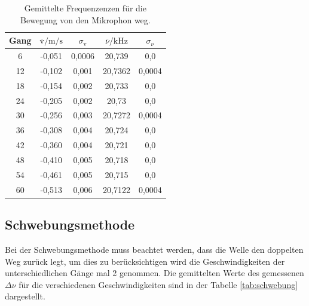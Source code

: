 \begin{table}
  \centering
  \caption{Gemittelte Frequenzenzen für die Bewegung von den Mikrophon weg.}
  \label{tab:rückwärts}
  \begin{tabular}{c c c c c}
    \toprule
Gang &  $\overline{\text{v}}/\si{\meter\per\second}$ & $\sigma_{\text{v}}$
 & $\overline{\nu}/\si{\kilo\hertz}$ & $\sigma_{\nu}$\\
    \midrule
    6  & -0,051 & 0,0006   & 20,739  & 0,0\\
    12 & -0,102 & 0,001    & 20,7362 & 0,0004\\
    18 & -0,154 & 0,002    & 20,733  & 0,0\\
    24 & -0,205 & 0,002    & 20,73   & 0,0\\
    30 & -0,256 & 0,003    & 20,7272 & 0,0004\\
    36 & -0,308 & 0,004    & 20,724  & 0,0\\
    42 & -0,360 & 0,004    & 20,721  & 0,0\\
    48 & -0,410 & 0,005    & 20,718  & 0,0\\
    54 & -0,461 & 0,005    & 20,715  & 0,0\\
    60 & -0,513 & 0,006    & 20,7122 & 0,0004\\

    \bottomrule
  \end{tabular}
\end{table}


\subsection{Schwebungsmethode}
Bei der Schwebungsmethode muss beachtet werden, dass die
Welle den doppelten Weg zurück legt, um dies zu berücksichtigen
wird die
Geschwindigkeiten der unterschiedlichen Gänge mal 2
genommen. Die gemittelten Werte des gemessenen $\Delta\nu$
für die verschiedenen Geschwindigkeiten
sind in der Tabelle \ref{tab:schwebung} dargestellt.

